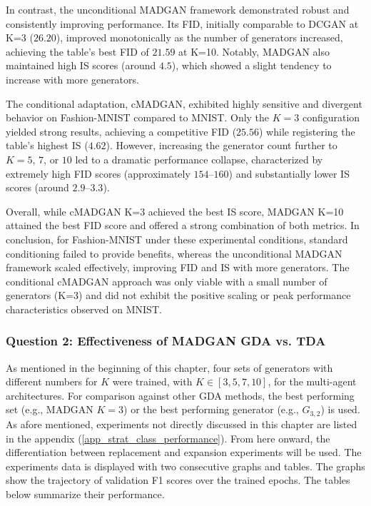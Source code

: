 In contrast, the unconditional MADGAN framework demonstrated robust and consistently improving performance. Its FID, initially comparable to DCGAN at K=3 ($26.20$), improved monotonically as the number of generators increased, achieving the table's best FID of $21.59$ at K=10. Notably, MADGAN also maintained high IS scores (around $4.5$), which showed a slight tendency to increase with more generators.

The conditional adaptation, cMADGAN, exhibited highly sensitive and divergent behavior on Fashion-MNIST compared to MNIST. Only the $K = 3$ configuration yielded strong results, achieving a competitive FID ($25.56$) while registering the table's highest IS ($4.62$). However, increasing the generator count further to $K = 5$, $7$, or $10$ led to a dramatic performance collapse, characterized by extremely high FID scores (approximately $154$–$160$) and substantially lower IS scores (around $2.9$–$3.3$).

Overall, while cMADGAN K=3 achieved the best IS score, MADGAN K=10 attained the best FID score and offered a strong combination of both metrics. In conclusion, for Fashion-MNIST under these experimental conditions, standard conditioning failed to provide benefits, whereas the unconditional MADGAN framework scaled effectively, improving FID and IS with more generators. The conditional cMADGAN approach was only viable with a small number of generators (K=3) and did not exhibit the positive scaling or peak performance characteristics observed on MNIST.

\subsubsection[Question 2]{Question 2: Effectiveness of MADGAN GDA vs. TDA}\label{exp_results_ans_q2}
 As mentioned in the beginning of this chapter, four sets of generators with different numbers for \(K\) were trained, with \(K \in [3, 5, 7, 10]\), for the multi-agent architectures. For comparison against other GDA methods, the best performing set (e.g., MADGAN \(K=3\)) or the best performing generator (e.g., \(G_{3,2}\)) is used. As afore mentioned, experiments not directly discussed in this chapter are listed in the appendix (\ref{app_strat_class_performance}). From here onward, the differentiation between replacement and expansion experiments will be used. The experiments data is displayed with two consecutive graphs and tables. The graphs show the trajectory of validation F1 scores over the trained epochs. The tables below summarize their performance.


